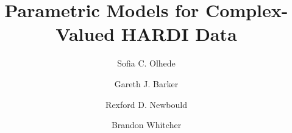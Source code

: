\documentclass[authoryear,preprint,12pt]{elsarticle}
\begin{document}
\begin{frontmatter}



\title{Parametric Models for Complex-Valued HARDI Data}


\author[label1]{Sofia C. Olhede}

\author[label2]{Gareth J. Barker}

\author[label3]{Rexford D. Newbould}

\author[label3]{Brandon Whitcher}

\address[label1]{Department of Statistical Science, University
  College, London, United Kingdom}
\address[label2]{King's College London, Institute of Psychiatry,
  Department of Clinical Neuroscience, Centre for Neuroimaging
  Sciences, London, United Kingdom}
\address[label3]{Clinical Imaging Centre, GlaxoSmithKline, London,
  United Kingdom}


\end{frontmatter}
\end{document}
